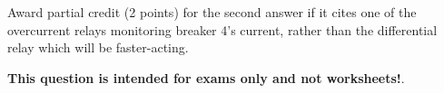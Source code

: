 Award partial credit (2 points) for the second answer if it cites one of the overcurrent relays monitoring breaker 4's current, rather than the differential relay which will be faster-acting.







{\bf This question is intended for exams only and not worksheets!}.



